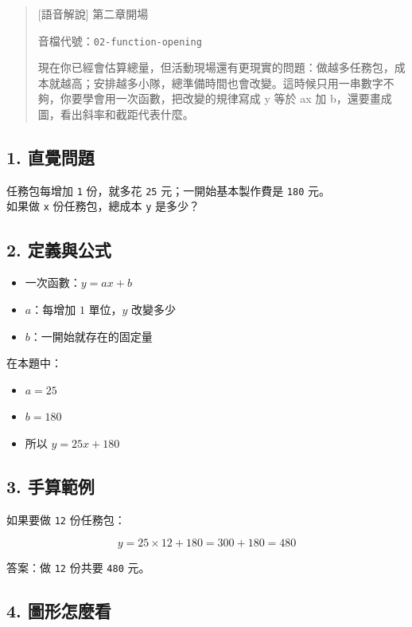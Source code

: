 \documentclass[
  chinese,
  12pt,
  a4paper,
  oneside]{article}
\providecommand{\tightlist}{%
  \setlength{\itemsep}{0pt}\setlength{\parskip}{0pt}}
\begin{document}
\begin{quote}
{[}語音解說{]} 第二章開場

音檔代號：\texttt{02-function-opening}

現在你已經會估算總量，但活動現場還有更現實的問題：做越多任務包，成本就越高；安排越多小隊，總準備時間也會改變。這時候只用一串數字不夠，你要學會用一次函數，把改變的規律寫成
y 等於 ax 加 b，還要畫成圖，看出斜率和截距代表什麼。
\end{quote}

\subsection{1. 直覺問題}\label{ux76f4ux89baux554fux984c-2}

任務包每增加 \texttt{1} 份，就多花 \texttt{25} 元；一開始基本製作費是
\texttt{180} 元。\\
如果做 \texttt{x} 份任務包，總成本 \texttt{y} 是多少？

\subsection{2. 定義與公式}\label{ux5b9aux7fa9ux8207ux516cux5f0f}

\begin{itemize}
\tightlist
\item
  一次函數：\(y = ax + b\)
\item
  \(a\)：每增加 \(1\) 單位，\(y\) 改變多少
\item
  \(b\)：一開始就存在的固定量
\end{itemize}

在本題中：

\begin{itemize}
\tightlist
\item
  \(a = 25\)
\item
  \(b = 180\)
\item
  所以 \(y = 25x + 180\)
\end{itemize}

\subsection{3. 手算範例}\label{ux624bux7b97ux7bc4ux4f8b-2}

如果要做 \texttt{12} 份任務包：

\[
y = 25\times 12 + 180 = 300 + 180 = 480
\]

答案：做 \texttt{12} 份共要 \texttt{480} 元。

\subsection{4. 圖形怎麼看}\label{ux5716ux5f62ux600eux9ebcux770b}
\end{document}

